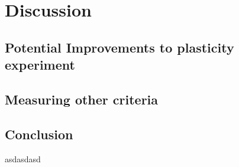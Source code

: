 \documentclass[12pt]{article}
\begin{document}
\section{Discussion}

	\subsection{Potential Improvements to plasticity experiment}
	
	\subsection{Measuring other criteria}
	
	\subsection{Conclusion}



\begin{thebibliography}{99}
\singlespacing

 asdasdasd

\end{thebibliography}
\end{document}
